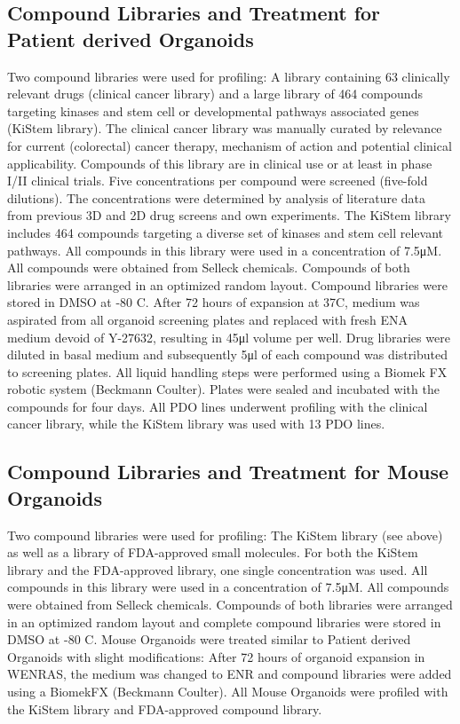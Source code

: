 \begin{flushleft}
\subsection{Compound Libraries and Treatment for Patient derived Organoids}
Two compound libraries were used for profiling: A library containing 63 clinically relevant drugs (clinical cancer library) and a large library of 464 compounds targeting kinases and stem cell or developmental pathways associated genes (KiStem library). The clinical cancer library was manually curated by relevance for current (colorectal) cancer therapy, mechanism of action and potential clinical applicability. Compounds of this library are in clinical use or at least in phase I/II clinical trials. Five concentrations per compound were screened (five-fold dilutions). The concentrations were determined by analysis of literature data from previous 3D and 2D drug screens and own experiments. The KiStem library includes 464 compounds targeting a diverse set of kinases and stem cell relevant pathways. All compounds in this library were used in a concentration of 7.5μM. All compounds were obtained from Selleck chemicals. Compounds of both libraries were arranged in an optimized random layout. Compound libraries were stored in DMSO at -80 C.
\bigbreak
After 72 hours of expansion at 37C, medium was aspirated from all organoid screening plates and replaced with fresh ENA medium devoid of Y-27632, resulting in 45μl volume per well. Drug libraries were diluted in basal medium and subsequently 5μl of each compound was distributed to screening plates. 
All liquid handling steps were performed using a Biomek FX robotic system (Beckmann Coulter). Plates were sealed and incubated with the compounds for four days. All PDO lines underwent profiling with the clinical cancer library, while the KiStem library was used with 13 PDO lines.

\subsection{Compound Libraries and Treatment for Mouse Organoids}
Two compound libraries were used for profiling: The KiStem library (see above) as well as a library of FDA-approved small molecules. For both the KiStem library and the FDA-approved library, one single concentration was used. All compounds in this library were used in a concentration of 7.5μM. All compounds were obtained from Selleck chemicals. Compounds of both libraries were arranged in an optimized random layout and complete compound libraries were stored in DMSO at -80 C.
\bigbreak
Mouse Organoids were treated similar to Patient derived Organoids with slight modifications: After 72 hours of organoid expansion in WENRAS, the medium was changed to ENR and compound libraries were added using a BiomekFX (Beckmann Coulter). All Mouse Organoids were profiled with the KiStem library and FDA-approved compound library.


\end{flushleft}
